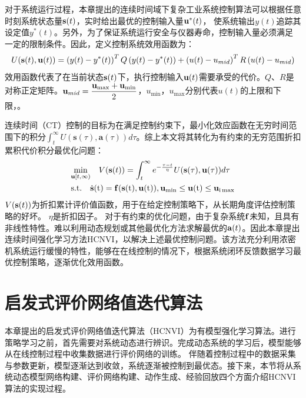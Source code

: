 对于系统运行过程，本章提出的连续时间域下复杂工业系统控制算法可以根据任意时刻系统状态量$\mathbf s(t)$，实时给出最优的控制输入量$\mathbf u^*(t)$，
使系统输出$y(t)$追踪其设定值$y^*(t)$。另外，为了保证系统运行安全与仪器寿命，控制输入量必须满足一定的限制条件。因此，定义控制系统效用函数为：
\begin{equation}
U(\mathbf s(t), \mathbf u(t))=\left(y(t)-y^{*}(t)\right)^{T}Q\left(y(t)-y^{*}(t)\right)+\left(u(t)-{u_{m i d}}\right)^{T} R\left(u(t)-{u_{m i d}}\right)
\label{equ:U}
\end{equation}
效用函数代表了在当前状态$\mathbf s(t)$下，执行控制输入${\mathbf u}(t)$需要承受的代价。$Q$、$R$是对称正定矩阵。$\mathbf u_{mid}=\dfrac{\mathbf u _ { \max } + \mathbf u _ { \min }}{2}$，$u _{\min}$，$u _{\max}$分别代表$u(t)$的上限和下限，。

连续时间（CT）控制的目标为在满足控制约束下，最小化效应函数在无穷时间范围下的积分$\int_{t}^{\infty} U(\mathbf{s}(\tau), \mathbf{a}(\tau)) d \tau$。综上本文将其转化为有约束的无穷范围折扣累积代价积分最优化问题：
\begin{equation}
\label{equ:goal}
\begin{aligned}
&{\min_{\mathbf u[t,\infty)}} \quad V(\mathbf{s}(t))=\int_{t}^{\infty} e^{-\frac{\tau-t}{\eta}} U(\mathbf{s}(\tau), \mathbf{u}(\tau)) d \tau \\
& \rm{s.t.} \quad \dot{\mathbf{s}}(t)=\mathbf{f}(\mathbf{s}(t), \mathbf{u}(t)),{{\mathbf u}_{\min }}\le {\mathbf{u}}(t)\le {{\mathbf u}_{i\max }}
\end{aligned}
\end{equation}
$V(\mathbf s(t))$为折扣累计评价值函数，用于在给定控制策略下，从长期角度评估控制策略的好坏。
$\eta$是折扣因子。
对于有约束的优化问题，由于复杂系统$\mathbf f$未知，且具有非线性特性。难以利用动态规划或其他最优化方法求解最优的$\mathbf a(t)$。因此本章提出连续时间强化学习方法HCNVI，以解决上述最优控制问题。该方法充分利用浓密机系统运行缓慢的特性，能够在在线控制的情况下，根据系统闭环反馈数据学习最优控制策略，逐渐优化效用函数。
\section{启发式评价网络值迭代算法}
本章提出的启发式评价网络值迭代算法（HCNVI）为有模型强化学习算法。进行策略学习之前，首先需要对系统动态进行辨识。完成动态系统的学习后，模型能够从在线控制过程中收集数据进行评价网络的训练。
伴随着控制过程中的数据采集与参数更新，模型逐渐达到收敛，系统逐渐被控制到最优态。接下来，本节将从系统动态模型网络构建、评价网络构建、动作生成、经验回放四个方面介绍HCNVI算法的实现过程。
